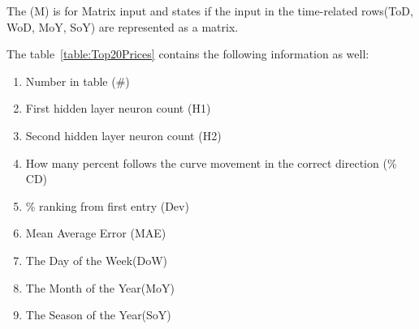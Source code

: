 The (M) is for Matrix input and states if the input in the time-related rows(ToD, WoD, MoY, SoY) are represented as a matrix.

The table~\ref{table:Top20Prices} contains the following information as well:
\begin{enumerate}
	\item Number in table (\#)
	\item First hidden layer neuron count (H1)
	\item Second hidden layer neuron count (H2)
	\item How many percent follows the curve movement in the correct direction (\% CD)
	\item \% ranking from first entry (Dev)
	\item Mean Average Error (MAE)
	\item The Day of the Week(DoW)
	\item The Month of the Year(MoY)
	\item The Season of the Year(SoY)
\end{enumerate}

